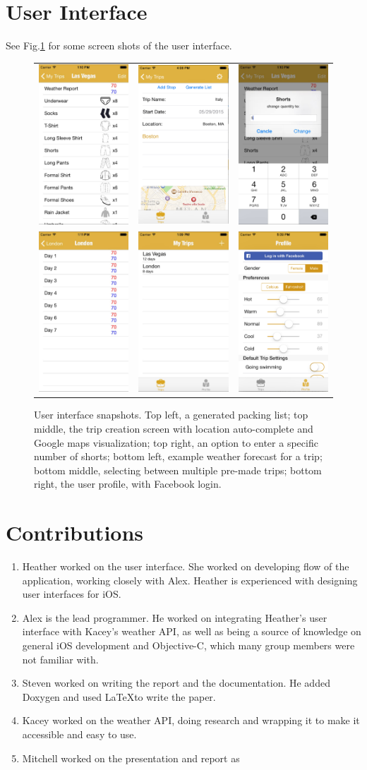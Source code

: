 \documentclass[11pt]{article}
\begin{document}
\section{User Interface}
See Fig.\ref{fig:ui} for some screen shots of the user interface.

\begin{figure}
    \centering
    \begin{tabular}{ccc}
    \includegraphics[scale=0.2]{img/ui-2.jpg} & \includegraphics[width=151pt]{img/ui-8.png} & \includegraphics[scale=0.2]{img/ui-7.jpg}\\
    \includegraphics[scale=0.2]{img/ui-5.jpg} & \includegraphics[scale=0.2]{img/ui-6.jpg} & \includegraphics[width=151pt]{img/ui-4.png}
    \end{tabular}
    \caption{User interface snapshots. Top left, a generated packing list; top middle, the trip creation screen with location auto-complete and Google maps visualization; top right, an option to enter a specific number of shorts; bottom left, example weather forecast for a trip; bottom middle, selecting between multiple pre-made trips; bottom right, the user profile, with Facebook login.}
    \label{fig:ui}
\end{figure}

% 

\section{Contributions}
\begin{enumerate}
\item Heather worked on the user interface. She worked on developing flow of the application, working closely with Alex. Heather is experienced with designing user interfaces for iOS.
\item Alex is the lead programmer. He worked on integrating Heather's user interface with Kacey's weather API, as well as being a source of knowledge on general iOS development and Objective-C, which many group members were not familiar with.
\item Steven worked on writing the report and the documentation. He added Doxygen and used \LaTeX to write the paper. 
\item Kacey worked on the weather API, doing research and wrapping it to make it accessible and easy to use. 
\item Mitchell worked on the presentation and report as 
\end{enumerate}
\end{document}
